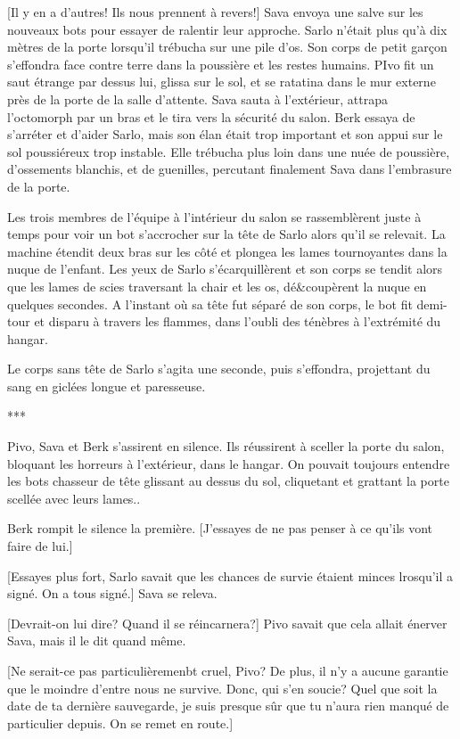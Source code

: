[Il y en a d'autres! Ils nous prennent à revers!] Sava envoya une salve sur les nouveaux bots pour essayer de ralentir leur approche. Sarlo n'était plus qu'à dix mètres de la porte lorsqu'il trébucha sur une pile d'os. Son corps de petit garçon s'effondra face contre terre dans la poussière et les restes humains. PIvo fit un saut étrange par dessus lui, glissa sur le sol, et se ratatina dans le mur externe près de la porte de la salle d'attente. Sava sauta à l'extérieur, attrapa l'octomorph par un bras et le tira vers la sécurité du salon. Berk essaya de s'arréter et d'aider Sarlo, mais son élan était trop important et son appui sur le sol poussiéreux trop instable. Elle trébucha plus loin dans une nuée de poussière, d'ossements blanchis, et de guenilles, percutant finalement Sava dans l'embrasure de la porte. 

Les trois membres de l'équipe à l'intérieur du salon se rassemblèrent juste à temps pour voir un bot s'accrocher sur la tête de Sarlo alors qu'il se relevait. La machine étendit deux bras sur les côté et plongea les lames tournoyantes dans la nuque de l'enfant. Les yeux de Sarlo s'écarquillèrent et son corps se tendit alors que les lames de scies traversant la chair et les os, dé&coupèrent la nuque en quelques secondes. A l'instant où sa tête fut séparé de son corps, le bot fit demi-tour et disparu à travers les flammes, dans l'oubli des ténèbres à l'extrémité du hangar. 

Le corps sans tête de Sarlo s'agita une seconde, puis s'effondra, projettant du sang en giclées longue et paresseuse. 

\begin{center} *** \end{center} 

Pivo, Sava et Berk s'assirent en silence. Ils réussirent à sceller la porte du salon, bloquant les horreurs à l'extérieur, dans le hangar. On pouvait toujours entendre les bots chasseur de tête glissant au dessus du sol, cliquetant et grattant la porte scellée avec leurs lames.. 

Berk rompit le silence la première. [J'essayes de ne pas penser à ce qu'ils vont faire de lui.] 

[Essayes plus fort, Sarlo savait que les chances de survie étaient minces lrosqu'il a signé. On a tous signé.] Sava se releva. 

[Devrait-on lui dire? Quand il se réincarnera?] Pivo savait que cela allait énerver Sava, mais il le dit quand même. 

[Ne serait-ce pas particulièremenbt cruel, Pivo? De plus, il n'y a aucune garantie que le moindre d'entre nous ne survive. Donc, qui s'en soucie? Quel que soit la date de ta dernière sauvegarde, je suis presque sûr que tu n'aura rien manqué de particulier depuis. On se remet en route.] 


